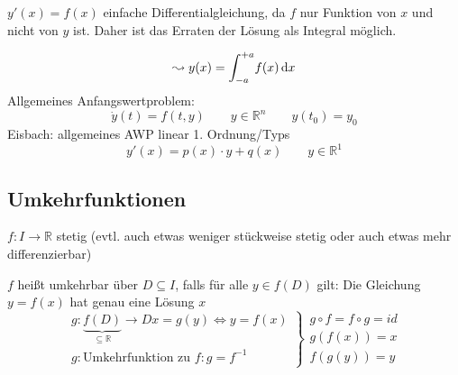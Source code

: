 
\noindent $y'(x) = f(x)$ einfache Differentialgleichung, da $f$ nur Funktion von $x$ und nicht von $y$ ist. 
Daher ist das Erraten der Lösung als Integral möglich.

\begin{equation*}\leadsto y(x) = \int_{-a}^{+a} \! f(x) \, \mathrm d x\end{equation*}
Allgemeines Anfangswertproblem:
\begin{equation*}\dot y(t) = f(t, y) \qquad y \in \mathbb{R}^n \qquad y(t_0) = y_0\end{equation*}
Eisbach: allgemeines AWP linear 1. Ordnung/Typs
\[ y'(x) = p(x)\cdot y + q(x)\qquad y \in \mathbb{R}^1 \]

\subsection{Umkehrfunktionen}
$f: I \to \mathbb{R}$ stetig (evtl. auch etwas weniger stückweise stetig oder auch etwas mehr differenzierbar)

\begin{definition}[Umkehrbarkeit]
    $f$ heißt umkehrbar über $D \subseteq I$, falls für alle $y \in f(D)$ gilt:
    Die Gleichung $y=f(x)$ hat genau eine Lösung $x$
    \begin{equation*}
        \left.
        \begin{array}{r}
            g:\underbrace{f(D)}_{\subseteq \mathbb{R}} \to D x= g(y) \Leftrightarrow y=f(x) \\
            g: \text{Umkehrfunktion zu }f: g=f^{-1}
        \end{array}
        \right\}
        \begin{array}{l}
            g \circ f = f \circ g = id\\
            g(f(x)) = x\\
            f(g(y)) = y
        \end{array}
    \end{equation*}
\end{definition}

